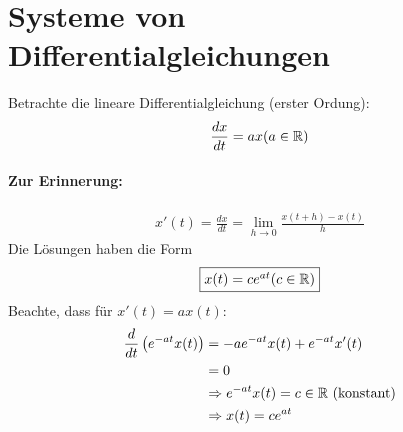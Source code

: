 \section{Systeme von Differentialgleichungen}

Betrachte die lineare Differentialgleichung (erster Ordung):
\begin{align}
\frac{dx}{dt} = ax (a \in \mathbb{R})
\end{align}

\paragraph{Zur Erinnerung:}
\begin{align}
x'(t) = \frac{dx}{dt} = \lim_{h \rightarrow 0} \frac{x(t+h) - x(t)}{h}
\end{align}
Die Lösungen haben die Form
\begin{equation}
\fbox{$x(t) = ce^{at} (c \in \mathbb{R})$}
\end{equation}
Beachte, dass für $x'(t) = ax(t)$:
\begin{align}
\frac{d}{dt} \left ( e^{-at} x(t) \right ) &= -ae^{-at} x(t) + e^{-at} x'(t) \\
&= 0 \\
&\Rightarrow e^{-at} x(t) = c \in \mathbb{R} \text{ (konstant)}\\
&\Rightarrow x(t) = ce^{at}
\end{align}

